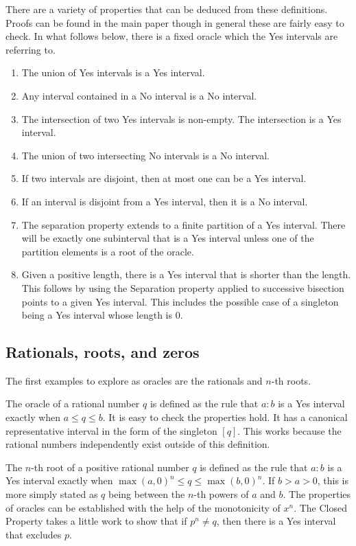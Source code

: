 \documentclass[12pt]{article}
\theoremstyle{remark}
\begin{document}
There are a variety of properties that can be deduced from these definitions. Proofs can be found in the main paper though in general these are fairly easy to check. In what follows below, there is a fixed oracle which the Yes intervals are referring to.

\begin{enumerate}
    \item The union of Yes intervals is a Yes interval. 
    \item Any interval contained in a No interval is a No interval. 
    \item The intersection of two Yes intervals is non-empty. The intersection is a Yes interval. 
    \item The union of two intersecting No intervals is a No interval. 
    \item If two intervals are disjoint, then at most one can be a Yes interval. 
    \item If an interval is disjoint from a Yes interval, then it is a No interval. 
    \item The separation property extends to a finite partition of a Yes interval. There will be exactly one subinterval that is a Yes interval unless one of the partition elements is a root of the oracle.   
    \item Given a positive length, there is a Yes interval that is shorter than the length. This follows by using the Separation property applied to successive bisection points to a given Yes interval. This includes the possible case of a singleton being a Yes interval whose length is 0. 
\end{enumerate}

\subsection{Rationals, roots, and zeros}

The first examples to explore as oracles are the rationals and $n$-th roots. 

The oracle of a rational number $q$ is defined as the rule that $a:b$ is a Yes interval exactly when $a \leq q \leq b$. It is easy to check the properties hold. It has a canonical representative interval in the form of the singleton $[q]$. This works because the rational numbers independently exist outside of this definition. 

The $n$-th root of a positive rational number $q$ is defined as the rule that $a:b$ is a Yes interval exactly when $\max(a, 0)^n \leq q \leq \max(b,0)^n$. If $b > a> 0$, this is more simply stated as $q$ being between the $n$-th powers of $a$ and $b$. The properties of oracles can be established with the help of the monotonicity of $x^n$. The Closed Property takes a little work to show that if $p^n \neq q$, then there is a Yes interval that excludes $p$. 
\end{document}
